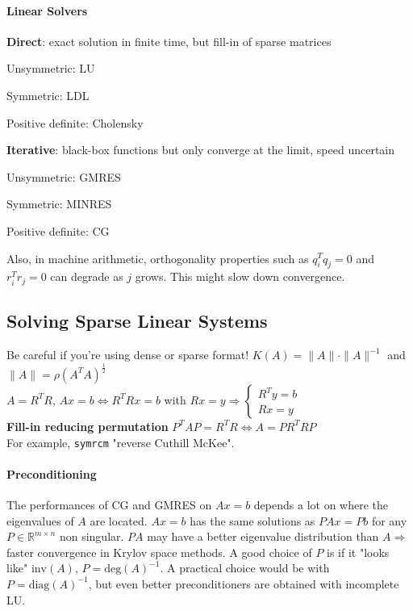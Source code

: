 \documentclass[10pt]{report}
\begin{document}
\paragraph{Linear Solvers}
\begin{list}{}{}
	\item \textbf{Direct}: exact solution in finite time, but fill-in of sparse matrices\begin{list}{}{}
		\item Unsymmetric: LU
		\item Symmetric: LDL
		\item Positive definite: Cholensky
	\end{list}
	\item \textbf{Iterative}: black-box functions but only converge at the limit, speed uncertain\begin{list}{}{}
		\item Unsymmetric: GMRES
		\item Symmetric: MINRES
		\item Positive definite: CG
	\end{list}
\end{list}
Also, in machine arithmetic, orthogonality properties such as $q_i^Tq_j=0$ and $r_i^Tr_j=0$ can degrade as $j$ grows. This might slow down convergence.
\subsection{Solving Sparse Linear Systems}
Be careful if you're using dense or sparse format! $K(A) = \|A\|\cdot\|A\|^{-1}$ and $\|A\|=\rho(A^TA)^{\frac{1}{2}}$\\
$A=R^TR$, $Ax=b\Leftrightarrow R^TRx=b$ with $Rx=y \Rightarrow\left\{\begin{array}{l}
R^Ty = b\\Rx=y
\end{array}\right.$\\
\textbf{Fill-in reducing permutation} $P^TAP = R^TR\Leftrightarrow A = PR^TRP$\\
For example, \texttt{symrcm} "reverse Cuthill McKee".
\paragraph{Preconditioning} The performances of CG and GMRES on $Ax=b$ depends a lot on where the eigenvalues of $A$ are located. $Ax=b$ has the same solutions as $PAx = Pb$ for any $P\in \mathbb{R}^{m\times n}$ non singular. $PA$ may have a better eigenvalue distribution than $A\Rightarrow$ faster convergence in Krylov space methods. A good choice of $P$ is if it "looks like" $\text{inv}(A)$, $P = \text{deg}(A)^{-1}$. A practical choice would be with $P=\text{diag}(A)^{-1}$, but even better preconditioners are obtained with incomplete LU.
\end{document}
